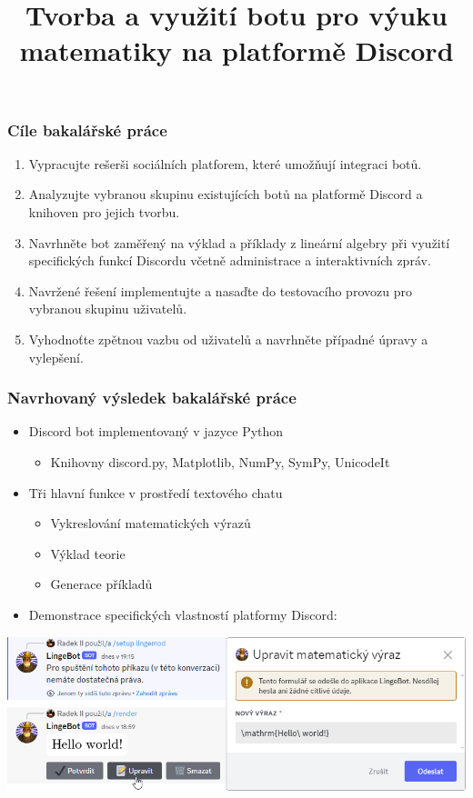 \documentclass[FM]{tulpresentation} %
\title{Tvorba a využití botu pro výuku matematiky na platformě Discord}
\begin{document}
	\TULtitleframe
	
	\begin{frame}\frametitle{Cíle bakalářské práce}
		\begin{enumerate}
			\item Vypracujte rešerši sociálních platforem, které umožňují integraci botů.
			\item Analyzujte vybranou skupinu existujících botů na platformě Discord a knihoven pro jejich tvorbu.
			\item Navrhněte bot zaměřený na výklad a příklady z lineární algebry při využití specifických funkcí Discordu včetně administrace a interaktivních zpráv.
			\item Navržené řešení implementujte a nasaďte do testovacího provozu pro vybranou skupinu uživatelů.
			\item Vyhodnoťte zpětnou vazbu od uživatelů a navrhněte případné úpravy a vylepšení.
		\end{enumerate}
	\end{frame}
	
	\begin{frame}\frametitle{Navrhovaný výsledek bakalářské práce}
		\begin{itemize}
			\item Discord bot implementovaný v jazyce Python
			\begin{itemize}
				\item Knihovny discord.py, Matplotlib, NumPy, SymPy, UnicodeIt
			\end{itemize}
			\item Tři hlavní funkce v prostředí textového chatu
			\begin{itemize}
				\item Vykreslování matematických výrazů
				\item Výklad teorie
				\item Generace příkladů
			\end{itemize}
			\item Demonstrace specifických vlastností platformy Discord:			
		\end{itemize}
		\includegraphics[width=.95\paperwidth]{img/idk}
	\end{frame}
	
\end{document}
